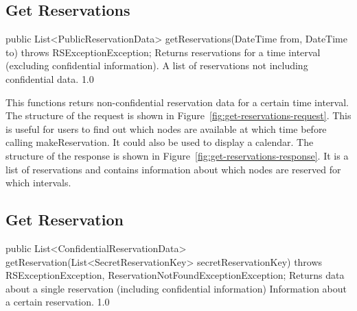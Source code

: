 \documentclass[a4paper,11pt]{article}
\begin{document}
			\subsection{Get Reservations}

\begin{apidoc}
	{public List<PublicReservationData> getReservations(DateTime from, DateTime to) throws RSExceptionException;} %
	{Returns reservations for a time interval (excluding confidential information).} %
	{
	} %
	{A list of reservations not including confidential data.} %
	{} %
	{1.0} %
\end{apidoc}

This functions returs non-confidential reservation data for a certain time interval. The structure of the request is shown in Figure~\ref{fig:get-reservations-request}. This is useful for users to find out which nodes are available at which time before calling makeReservation. It could also be used to display a calendar. The structure of the response is shown in Figure~\ref{fig:get-reservations-response}. It is a list of reservations and contains information about which nodes are reserved for which intervals. 

	
			\sectionfin
			\subsection{Get Reservation}
	
\begin{apidoc}
	{public List<ConfidentialReservationData> getReservation(List<SecretReservationKey> secretReservationKey) throws RSExceptionException, ReservationNotFoundExceptionException;} %
	{Returns data about a single reservation (including confidential information)} %
	{
	} %
	{Information about a certain reservation.} %
	{} %
	{1.0} %
\end{apidoc}
	
\end{document}

